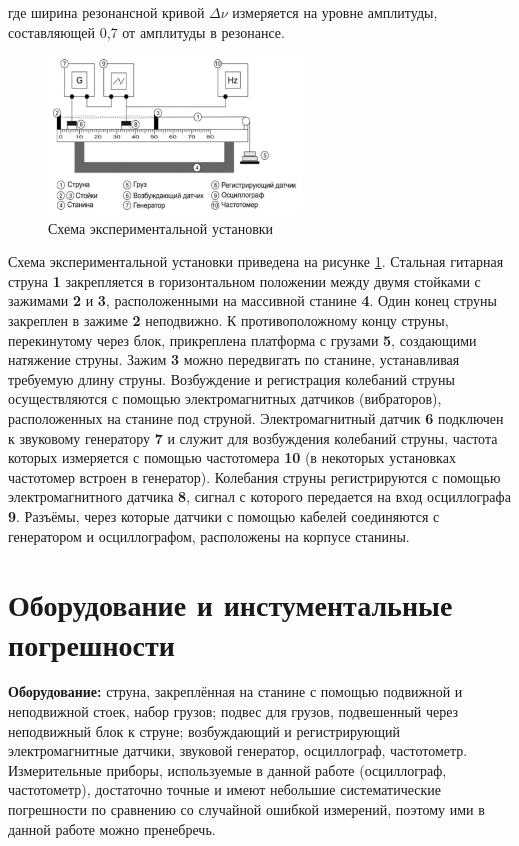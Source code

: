 \documentclass[a4paper,12pt]{article} %
\begin{document}
где ширина резонансной кривой $ \Delta \nu $ измеряется на уровне амплитуды, составляющей 0,7 от амплитуды в резонансе.

\begin{figure}
    \centering
    \includegraphics[width = 0.6\textwidth]{1.4.5 setup.PNG}
    \caption{Схема экспериментальной установки}
    \label{fig:setup}
\end{figure}

Схема экспериментальной установки приведена на рисунке \ref{fig:setup}. Стальная гитарная струна \textbf{1} закрепляется в горизонтальном положении между двумя стойками с зажимами \textbf{2} и \textbf{3}, расположенными на массивной станине \textbf{4}. Один конец струны
закреплен в зажиме \textbf{2} неподвижно. К противоположному концу струны, перекинутому через блок, прикреплена платформа с грузами \textbf{5}, создающими
натяжение струны. Зажим \textbf{3} можно передвигать по станине, устанавливая
требуемую длину струны. Возбуждение и регистрация колебаний струны
осуществляются с помощью электромагнитных датчиков (вибраторов),
расположенных на станине под струной. Электромагнитный датчик \textbf{6} подключен к звуковому генератору \textbf{7} и служит для возбуждения колебаний струны, частота которых измеряется с помощью частотомера \textbf{10} (в некоторых установках частотомер встроен в генератор). Колебания струны регистрируются с помощью электромагнитного датчика \textbf{8}, сигнал с которого
передается на вход осциллографа \textbf{9}. Разъёмы, через которые датчики с помощью кабелей соединяются с генератором и осциллографом, расположены на корпусе станины.

\section{Оборудование и инстументальные погрешности}
\textbf{Оборудование:} струна, закреплённая на станине с помощью подвижной и неподвижной стоек, набор грузов; подвес для грузов, подвешенный через неподвижный блок к струне; возбуждающий и регистрирующий электромагнитные датчики, звуковой генератор, осциллограф, частотометр. \\
Измерительные приборы, используемые в данной работе (осциллограф, частотометр), достаточно точные и имеют небольшие систематические погрешности по сравнению со случайной ошибкой измерений, поэтому ими в данной работе можно пренебречь.
\end{document}
